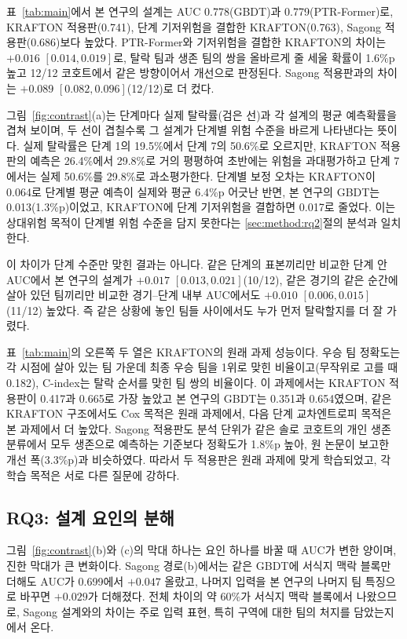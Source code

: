 표~\ref{tab:main}에서 본 연구의 설계는 AUC 0.778(GBDT)과 0.779(PTR-Former)로, KRAFTON 적용판(0.741), 단계 기저위험을 결합한 KRAFTON(0.763), Sagong 적용판(0.686)보다 높았다.
PTR-Former와 기저위험을 결합한 KRAFTON의 차이는 $+0.016$ $[0.014, 0.019]$로, 탈락 팀과 생존 팀의 쌍을 올바르게 줄 세울 확률이 1.6\%p 높고 12/12 코호트에서 같은 방향이어서 개선으로 판정된다.
Sagong 적용판과의 차이는 $+0.089$ $[0.082, 0.096]$(12/12)로 더 컸다.

그림~\ref{fig:contrast}(a)는 단계마다 실제 탈락률(검은 선)과 각 설계의 평균 예측확률을 겹쳐 보이며, 두 선이 겹칠수록 그 설계가 단계별 위험 수준을 바르게 나타낸다는 뜻이다.
실제 탈락률은 단계 1의 19.5\%에서 단계 7의 50.6\%로 오르지만, KRAFTON 적용판의 예측은 26.4\%에서 29.8\%로 거의 평평하여 초반에는 위험을 과대평가하고 단계 7에서는 실제 50.6\%를 29.8\%로 과소평가한다.
단계별 보정 오차는 KRAFTON이 0.064로 단계별 평균 예측이 실제와 평균 6.4\%p 어긋난 반면, 본 연구의 GBDT는 0.013(1.3\%p)이었고, KRAFTON에 단계 기저위험을 결합하면 0.017로 줄었다.
이는 상대위험 목적이 단계별 위험 수준을 담지 못한다는 \ref{sec:method:rq2}절의 분석과 일치한다.

이 차이가 단계 수준만 맞힌 결과는 아니다.
같은 단계의 표본끼리만 비교한 단계 안 AUC에서 본 연구의 설계가 $+0.017$ $[0.013, 0.021]$(10/12), 같은 경기의 같은 순간에 살아 있던 팀끼리만 비교한 경기--단계 내부 AUC에서도 $+0.010$ $[0.006, 0.015]$(11/12) 높았다.
즉 같은 상황에 놓인 팀들 사이에서도 누가 먼저 탈락할지를 더 잘 가렸다.

표~\ref{tab:main}의 오른쪽 두 열은 KRAFTON의 원래 과제 성능이다.
우승 팀 정확도는 각 시점에 살아 있는 팀 가운데 최종 우승 팀을 1위로 맞힌 비율이고(무작위로 고를 때 0.182), C-index는 탈락 순서를 맞힌 팀 쌍의 비율이다.
이 과제에서는 KRAFTON 적용판이 0.417과 0.665로 가장 높았고 본 연구의 GBDT는 0.351과 0.654였으며, 같은 KRAFTON 구조에서도 Cox 목적은 원래 과제에서, 다음 단계 교차엔트로피 목적은 본 과제에서 더 높았다.
Sagong 적용판도 분석 단위가 같은 솔로 코호트의 개인 생존 분류에서 모두 생존으로 예측하는 기준보다 정확도가 1.8\%p 높아, 원 논문이 보고한 개선 폭(3.3\%p)과 비슷하였다.
따라서 두 적용판은 원래 과제에 맞게 학습되었고, 각 학습 목적은 서로 다른 질문에 강하다.

\subsection{RQ3: 설계 요인의 분해}
\label{sec:results:rq3}

그림~\ref{fig:contrast}(b)와 (c)의 막대 하나는 요인 하나를 바꿀 때 AUC가 변한 양이며, 진한 막대가 큰 변화이다.
Sagong 경로(b)에서는 같은 GBDT에 서식지 맥락 블록만 더해도 AUC가 0.699에서 $+0.047$ 올랐고, 나머지 입력을 본 연구의 나머지 팀 특징으로 바꾸면 $+0.029$가 더해졌다.
전체 차이의 약 60\%가 서식지 맥락 블록에서 나왔으므로, Sagong 설계와의 차이는 주로 입력 표현, 특히 구역에 대한 팀의 처지를 담았는지에서 온다.

